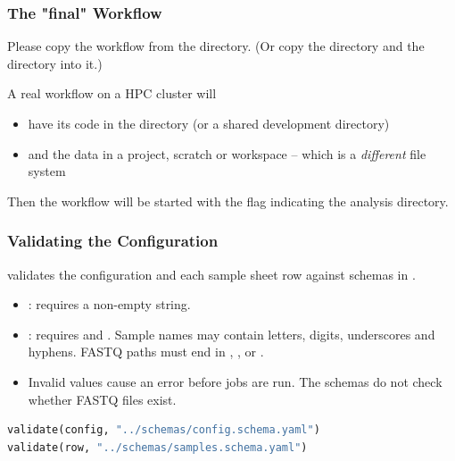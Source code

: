 \begin{frame}[fragile]
    \frametitle{The "final" Workflow}
    Please copy the  workflow from the  directory. (Or copy the directory and the  directory into it.)
    \pause
    \begin{warning}
        A real workflow on a HPC cluster will
        \begin{itemize}
            \item have its code in the  directory (or a shared development directory)
            \item and the data in a project, scratch or workspace -- which is a \emph{different} file system
        \end{itemize}
        Then the workflow will be started with the  flag indicating the analysis directory.
    \end{warning}
\end{frame}

\begin{frame}[fragile]
    \frametitle{Validating the Configuration}
     validates the configuration and each sample sheet row against schemas in .
    \begin{itemize}
        \item {}: requires a non-empty  string.
        \item {}: requires  and .
        Sample names may contain letters, digits, underscores and hyphens.
        FASTQ paths must end in , ,  or .
        \item Invalid values cause an error before jobs are run. The schemas do not check whether FASTQ files exist.
    \end{itemize}
    \begin{lstlisting}[language=Python,style=Python,basicstyle=\footnotesize]
validate(config, "../schemas/config.schema.yaml")
validate(row, "../schemas/samples.schema.yaml")
    \end{lstlisting}
\end{frame}

